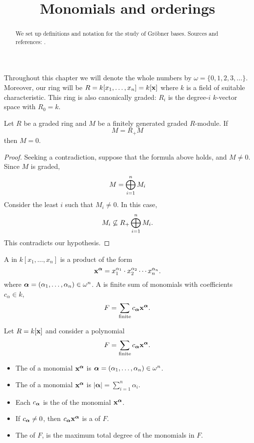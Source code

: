 \documentclass{ximera}
\title{Monomials and orderings}
\begin{document}
\begin{abstract}
  We set up definitions and notation for the study of Gr\"obner 
  bases. Sources and references: \cite{CLO2007}.
\end{abstract}
\maketitle

Throughout this chapter we will denote the whole numbers by $\omega =
\{0,1,2,3,\dots\}$. Moreover, our ring will be $R=k[x_1,\dots,x_n] =
k[\mathbf{x}]$ where $k$ is a field of suitable characteristic. This ring is
also canonically graded: $R_i$ is the degree-$i$ $k$-vector space with
$R_0=k$.

\begin{theorem}
  Let $R$ be a graded ring and $M$ be a finitely generated graded
  $R$-module. If
  \[
  M = R_+ M 
  \]
  then $M=0$.
  \begin{proof}
    Seeking a contradiction, suppose that the formula above holds, and
    $M\ne0$. Since $M$ is graded,
    \[
    M = \bigoplus_{i=1}^n M_i
    \]
    Consider the least $i$ such that $M_i \ne 0$. In this case,
    \[
    M_i \not\subseteq R_+\bigoplus_{i=1}^n M_i.
    \]
    This contradicts our hypothesis.
  \end{proof}
\end{theorem}

\begin{definition}
  A  in $k[x_1,\dots,x_n]$ is a product of the form
  \[
  \mathbf{x}^{{\boldsymbol\alpha}} = x_1^{\alpha_1}\cdot x_2^{\alpha_2}  \cdots x_n^{\alpha_n}.
  \]
  where ${\boldsymbol\alpha} = (\alpha_1,\dots,\alpha_n) \in
  \omega^n$.  A  is finite sum of monomials with
  coefficients $c_\alpha\in k$,
  \[
  F = \sum_{\mathrm{finite}} c_{{\boldsymbol\alpha}} \mathbf{x}^{{\boldsymbol\alpha}}.
  \]
\end{definition}


\begin{definition}
  Let $R = k[\mathbf{x}]$ and consider a polynomial
  \[
  F =  \sum_{\mathrm{finite}} c_{{\boldsymbol\alpha}} \mathbf{x}^{{\boldsymbol\alpha}}.
  \]
  \begin{itemize}
    \item The  of a monomial $\mathbf{x}^{{\boldsymbol\alpha}}$ is
      ${\boldsymbol\alpha}=(\alpha_1,\dots,\alpha_n)\in \omega^n$.
    \item The  of a monomial $\mathbf{x}^{{\boldsymbol\alpha}}$ is
      $|\boldsymbol{\alpha}| = \sum_{i=1}^n \alpha_i$.
    \item Each $c_{{\boldsymbol\alpha}}$ is the  of the
      monomial $\mathbf{x}^{{\boldsymbol\alpha}}$.
    \item If $c_{{\boldsymbol\alpha}} \ne 0$, then
      $c_{{\boldsymbol\alpha}}\mathbf{x}^{{\boldsymbol\alpha}}$ is a  of
      $F$.
    \item The  of $F$, is the maximum total degree
      of the monomials in $F$.
  \end{itemize}
\end{definition}
\end{document}
